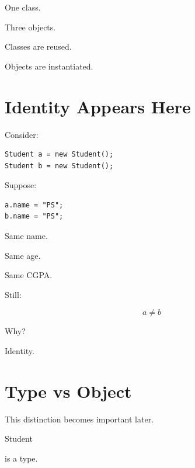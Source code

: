 \documentclass[11pt,a4paper]{book}
\begin{document}
\begin{idea}

One class.

Three objects.

\end{idea}

\begin{rosettarule}

Classes are reused.

Objects are instantiated.

\end{rosettarule}


\section{Identity Appears Here}

Consider:

\begin{verbatim}
Student a = new Student();
Student b = new Student();
\end{verbatim}

Suppose:

\begin{verbatim}
a.name = "PS";
b.name = "PS";
\end{verbatim}

Same name.

Same age.

Same CGPA.\@

Still:

\[
a \neq b
\]

Why?

Identity.


\section{Type vs Object}

This distinction becomes important later.

\begin{center}

Student

\end{center}

is a type.

\vspace{1em}
\end{document}
